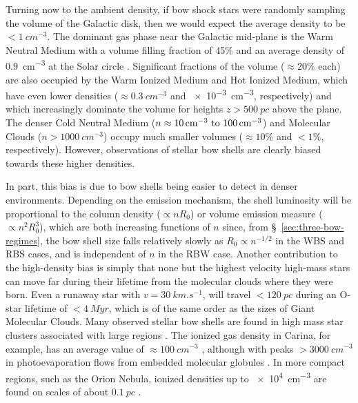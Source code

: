 Turning now to the ambient density, if bow shock stars were randomly
sampling the volume of the Galactic disk, then we would expect the
average density to be \(< \SI{1}{cm^{-3}}\).  The dominant gas phase
\citep{Ferriere:2001a} near the Galactic mid-plane is the Warm Neutral
Medium with a volume filling fraction of 45\% \citep[Fig.~11
of][]{Kalberla:2009a} and an average density of \SI{0.9}{cm^{-3}} at
the Solar circle \citep[\S~4 of][]{Kalberla:2008a}.  Significant
fractions of the volume (\(\approx 20\%\) each) are also occupied by the
Warm Ionized Medium and Hot Ionized Medium, which have even lower
densities (\(\approx \SI{0.3}{cm^{-3}}\) and \SI{e-3}{cm^{-3}},
respectively) and which increasingly dominate the volume for heights
\(z > \SI{500}{pc}\) above the plane.  The denser Cold Neutral Medium
(\(n \approx \text{\SIrange{10}{100}{cm^{-3}}}\)) and Molecular Clouds
(\(n > \SI{1000}{cm^{-3}}\)) occupy much smaller volumes
(\(\approx 10\%\) and \(< 1\%\), respectively).  However, observations of
stellar bow shells are clearly biased towards these higher densities.

In part, this bias is due to bow shells being easier to detect in denser
environments.  Depending on the emission mechanism, the shell
luminosity will be proportional to the column density
(\(\propto n R_0\)) or volume emission measure
(\(\propto n^2 R_0^3\)), which are both increasing functions of \(n\) since,
from \S~\ref{sec:three-bow-regimes}, the bow shell size falls relatively
slowly as \(R_0 \propto n^{-1/2}\) in the WBS and RBS cases, and is
independent of \(n\) in the RBW case.  Another contribution to the
high-density bias is simply that none but the highest velocity
high-mass stars can move far during their lifetime from the molecular
clouds where they were born.  Even a runaway star with
\(v = \SI{30}{km.s^{-1}}\), will travel \(< \SI{120}{pc}\) during an
O-star lifetime of \(< \SI{4}{Myr}\), which is of the same order as
the sizes of Giant Molecular Clouds.  Many observed stellar bow shells are
found in high mass star clusters associated with large \hii{} regions
\citep{Povich:2008a, Sexton:2015b}.  The ionized gas density in
Carina, for example, has an average value of
\(\approx \SI{100}{cm^{-3}}\) \citep{Oberst:2011a, Damiani:2016a}, although
with peaks \(> \SI{3000}{cm^{-3}}\) in photoevaporation flows from
embedded molecular globules \citep{Smith:2004a}.  In more compact
\hii{} regions, such as the Orion Nebula, ionized densities up to
\SI{e4}{cm^{-3}} are found on scales of about \(\SI{0.1}{pc}\)
\citep{Weilbacher:2015a, ODell:2017b}.

